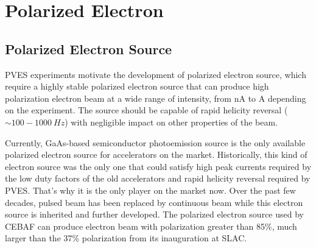\section{Polarized Electron}

\subsection{Polarized Electron Source}
PVES experiments motivate the development of polarized electron source, which 
require a highly stable polarized electron source that can produce
high polarization electron beam at a wide range of intensity, from nA to A 
depending on the experiment. The source should be capable of rapid helicity
reversal ($\sim 100-1000 \ Hz$) with negligible impact on other properties of the beam.

Currently, GaAs-based semiconductor photoemission source is %
the only available polarized electron source for accelerators on the market.
Historically, this 
kind of electron source was the only one that could satisfy high peak currents 
required by the low duty factors of the old accelerators and rapid helicity 
reversal required by PVES. That's why it is the only player on the market now.
Over the past few decades, pulsed beam has been replaced by continuous beam while
this electron source is inherited and further developed. The polarized electron
source used by CEBAF can produce electron beam with polarization greater than
85\%, much larger than the 37\% polarization from its inauguration at SLAC. \cite{PRESCOTT1978347}

